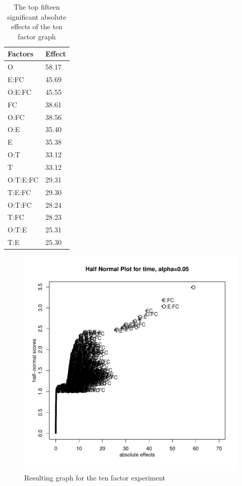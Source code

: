 \documentclass{llncs}
\begin{document}
\begin{table}
    \begin{tabular}{ | l l |}
    \hline
    {\bf Factors} & {\bf Effect}  \\ \hline
      O & 58.17 \\ \hline
      E:FC & 45.69 \\ \hline
      O:E:FC & 45.55\\ \hline
      FC & 38.61\\ \hline
      O:FC & 38.56\\ \hline
      O:E & 35.40\\ \hline
      E & 35.38\\ \hline
      O:T & 33.12\\ \hline
      T & 33.12\\ \hline
      O:T:E:FC & 29.31\\ \hline
      T:E:FC & 29.30\\ \hline
      O:T:FC & 28.24\\ \hline
      T:FC & 28.23\\ \hline
      O:T:E & 25.31\\ \hline
      T:E & 25.30\\ \hline
    \end{tabular}
\caption{The top fifteen significant absolute effects of the ten factor graph}\label{10factorEffect}
\end{table}


\begin{figure}
 \includegraphics[width=14cm]{10factorAvarageDanielPlot.pdf}
  \caption{Resulting graph for the ten factor experiment}\label{10factorGraph}
\end{figure}
\end{document}
